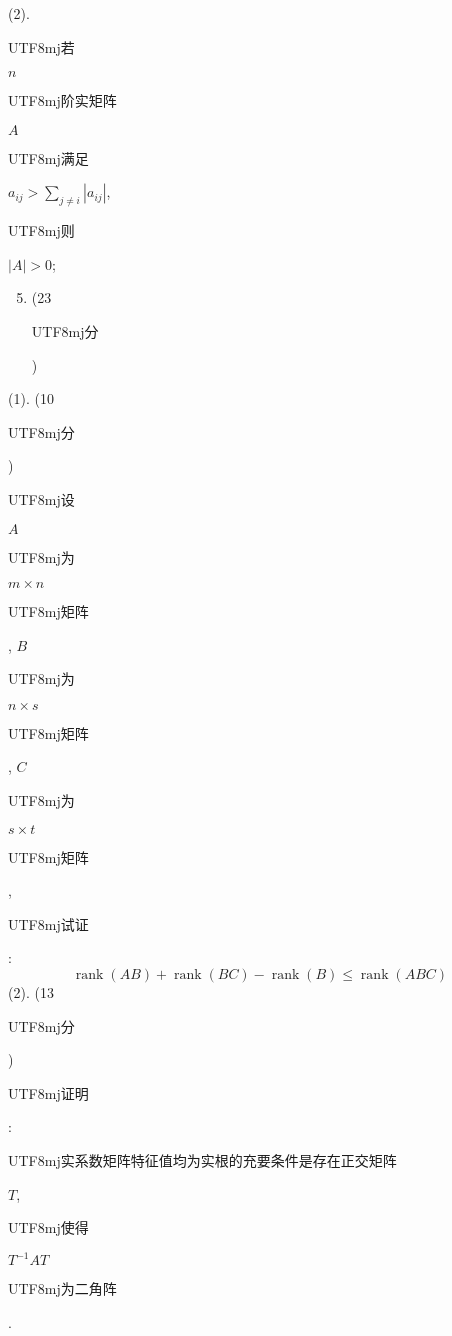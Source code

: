 \documentclass[10pt]{article}
\begin{document}
(2). \begin{CJK}{UTF8}{mj}若\end{CJK} $n$ \begin{CJK}{UTF8}{mj}阶实矩阵\end{CJK} $A$ \begin{CJK}{UTF8}{mj}满足\end{CJK} $a_{i j}>\sum_{j \neq i}\left|a_{i j}\right|$, \begin{CJK}{UTF8}{mj}则\end{CJK} $|A|>0$;

\begin{enumerate}
  \setcounter{enumi}{4}
  \item (23 \begin{CJK}{UTF8}{mj}分\end{CJK})
\end{enumerate}
(1). (10 \begin{CJK}{UTF8}{mj}分\end{CJK}) \begin{CJK}{UTF8}{mj}设\end{CJK} $A$ \begin{CJK}{UTF8}{mj}为\end{CJK} $m \times n$ \begin{CJK}{UTF8}{mj}矩阵\end{CJK}, $B$ \begin{CJK}{UTF8}{mj}为\end{CJK} $n \times s$ \begin{CJK}{UTF8}{mj}矩阵\end{CJK}, $C$ \begin{CJK}{UTF8}{mj}为\end{CJK} $s \times t$ \begin{CJK}{UTF8}{mj}矩阵\end{CJK}, \begin{CJK}{UTF8}{mj}试证\end{CJK}:
$$
\operatorname{rank}(A B)+\operatorname{rank}(B C)-\operatorname{rank}(B) \leq \operatorname{rank}(A B C)
$$
(2). (13 \begin{CJK}{UTF8}{mj}分\end{CJK}) \begin{CJK}{UTF8}{mj}证明\end{CJK}: \begin{CJK}{UTF8}{mj}实系数矩阵特征值均为实根的充要条件是存在正交矩阵\end{CJK} $T$, \begin{CJK}{UTF8}{mj}使得\end{CJK} $T^{-1} A T$ \begin{CJK}{UTF8}{mj}为二角阵\end{CJK}.
\end{document}
